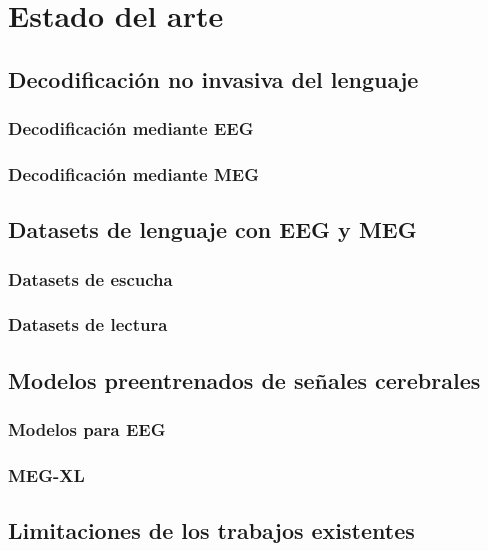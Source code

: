 \chapter{Estado del arte}

\section{Decodificación no invasiva del lenguaje}
\subsection{Decodificación mediante EEG}
\subsection{Decodificación mediante MEG}

\section{Datasets de lenguaje con EEG y MEG}
\subsection{Datasets de escucha}
\subsection{Datasets de lectura}

\section{Modelos preentrenados de señales cerebrales}
\subsection{Modelos para EEG}
\subsection{MEG-XL}

\section{Limitaciones de los trabajos existentes}


